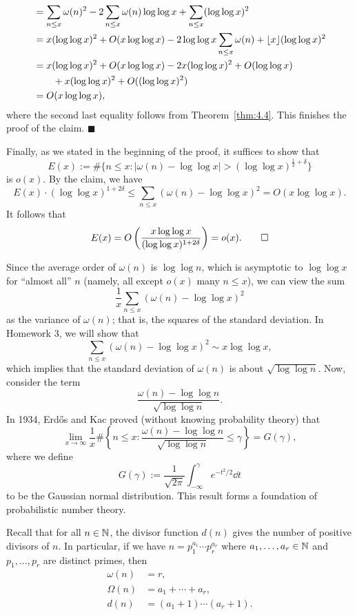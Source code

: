 \begin{pf}
\begin{align*}
        &= \sum_{n\leq x} \omega(n)^2 - 2\sum_{n\leq x} \omega(n)\log\log x 
        + \sum_{n\leq x} (\log\log x)^2 \\ 
        &= x(\log\log x)^2 + O(x\log\log x) - 2\log\log x \sum_{n\leq x} \omega(n)
        + \lfloor x\rfloor (\log\log x)^2 \\ 
        &= x(\log\log x)^2 + O(x\log\log x) - 2x(\log\log x)^2 + O(\log\log x) \\
        &\qquad + x(\log\log x)^2 + O((\log\log x)^2) \\ 
        &= O(x\log\log x), 
    \end{align*}
    where the second last equality follows from Theorem~\ref{thm:4.4}. This 
    finishes the proof of the claim. \hfill $\blacksquare$ 

    Finally, as we stated in the beginning of the proof, it suffices to show that 
    \[ E(x) := \#\{n \leq x : |\omega(n) - \log\log x| > (\log\log x)^{\frac12+\delta}\} \] 
    is $o(x)$. By the claim, we have 
    \[ E(x) \cdot (\log\log x)^{1+2\delta} 
    \leq \sum_{n\leq x} (\omega(n) - \log\log x)^2 = O(x\log\log x). \] 
    It follows that 
    \[ E(x) = O\left( \frac{x\log\log x}{(\log\log x)^{1+2\delta}} 
    \right) = o(x). \qedhere \] 
\end{pf}

\begin{remark}\label{remark:4.11}
    Since the average order of $\omega(n)$ is $\log\log n$, which is asymptotic 
    to $\log\log x$ for ``almost all'' $n$ (namely, all except $o(x)$ 
    many $n \leq x$), we can view the sum 
    \[ \frac1x \sum_{n\leq x} (\omega(n) - \log\log x)^2 \] 
    as the variance of $\omega(n)$; that is, the squares of the standard deviation. 
    In Homework 3, we will show that 
    \[ \sum_{n\leq x} (\omega(n) - \log\log x)^2 \sim x\log\log x, \] 
    which implies that the standard deviation of $\omega(n)$ is about 
    $\sqrt{\log\log n}$. Now, consider the term 
    \[ \frac{\omega(n) - \log\log n}{\sqrt{\log\log n}}. \] 
    In 1934, Erd\H{o}s and Kac proved (without knowing probability theory) that 
    \[ \lim_{x\to\infty} \frac1x \#\left\{ n\leq x : \frac{\omega(n) - 
    \log\log n}{\sqrt{\log\log n}} \leq \gamma \right\} = G(\gamma), \] 
    where we define 
    \[ G(\gamma) := \frac{1}{\sqrt{2\pi}} \int_{-\infty}^{\gamma} e^{-t^2/2}\dd t \] 
    to be the Gaussian normal distribution. This result forms a foundation 
    of probabilistic number theory. 
\end{remark}

Recall that for all $n \in \mathbb{N}$, the divisor function $d(n)$ gives the number of 
positive divisors of $n$. In particular, if we have $n = p_1^{a_1} \cdots p_r^{a_r}$
where $a_1, \dots, a_r \in \mathbb{N}$ and $p_1, \dots, p_r$ are distinct primes, then
\begin{align*} 
    \omega(n) &= r, \\ 
    \Omega(n) &= a_1 + \cdots + a_r, \\ 
    d(n) &= (a_1 + 1) \cdots (a_r + 1). 
\end{align*}

